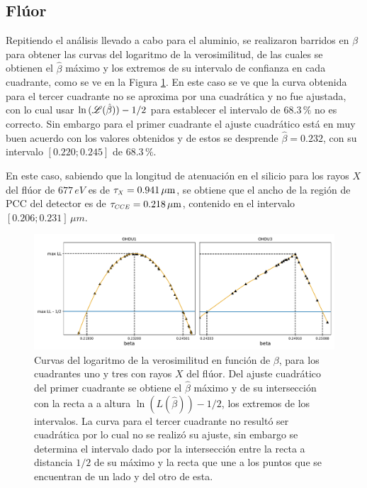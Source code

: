 \pagebreak
\subsection{Flúor}
\noindent Repitiendo el análisis llevado a cabo para el aluminio, se realizaron barridos en $\beta$ para obtener las curvas del logaritmo de la verosimilitud, de las cuales se obtienen el $\hat{\beta}$ máximo y los extremos de su intervalo de confianza en cada cuadrante, como se ve en la Figura \ref{fig:F_barridos_beta}. %
En este caso se ve que la curva obtenida para el tercer cuadrante no se aproxima por una cuadrática y no fue ajustada, con lo cual usar $\ln{(\mathscr{L}(\hat{\beta}))} - 1/2$ para establecer el intervalo de $68.3\,\%$ no es correcto. %
Sin embargo para el primer cuadrante el ajuste cuadrático está en muy buen acuerdo con los valores obtenidos y de estos se desprende $\hat{\beta} = 0.232$, con su intervalo $[0.220; 0.245]$ de $68.3\,\%$.

En este caso, sabiendo que la longitud de atenuación en el silicio para los rayos $X$ del flúor de $677\,\si{eV}$ es de $\tau_{\scaleto{X}{4pt}} = 0.941\,\si{\mu m}$\cite{AttenuationLength}, se obtiene que el ancho de la región de PCC del detector es de $\tau_{\scaleto{CCE}{4pt}} = 0.218\,\si{\mu m}$, contenido en el intervalo $[0.206; 0.231]\,\si{\mu m}$.
\begin{figure}[h]
    \centering
    \includegraphics[scale=0.5]{Figs/F_barridos_beta.pdf}
    \caption{Curvas del logaritmo de la verosimilitud en función de $\beta$, para los cuadrantes uno y tres con rayos $X$ del flúor. Del ajuste cuadrático del primer cuadrante se obtiene el $\hat{\beta}$ máximo y de su intersección con la recta a a altura $\ln{(L(\hat{\beta}))} - 1/2$, los extremos de los intervalos. La curva para el tercer cuadrante no resultó ser cuadrática por lo cual no se realizó su ajuste, sin embargo se determina el intervalo dado por la intersección entre la recta a distancia $1/2$ de su máximo y la recta que une a los puntos que se encuentran de un lado y del otro de esta.}
    \label{fig:F_barridos_beta}
\end{figure}

